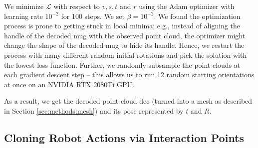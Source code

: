 \documentclass{article}
\begin{document}
We minimize $\mathcal{L}$ with respect to $v, s, t$ and $r$ using the Adam optimizer \cite{kingma17adam} with learning rate $10^{-2}$ for 100 steps. We set $\beta=10^{-2}$. We found the optimization process is prone to getting stuck in local minima; e.g., instead of aligning the handle of the decoded mug with the observed point cloud, the optimizer might change the shape of the decoded mug to hide its handle. Hence, we restart the process with many different random initial rotations and pick the solution with the lowest loss function. Further, we randomly subsample the point clouds at each gradient descent step -- this allows us to run 12 random starting orientations at once on an NVIDIA RTX 2080Ti GPU.

As a result, we get the decoded point cloud $\mathrm{dec}$ (turned into a mesh as described in Section \ref{sec:methods:mesh}) and its pose represented by $t$ and $R$.

\subsection{Cloning Robot Actions via Interaction Points}
\end{document}
